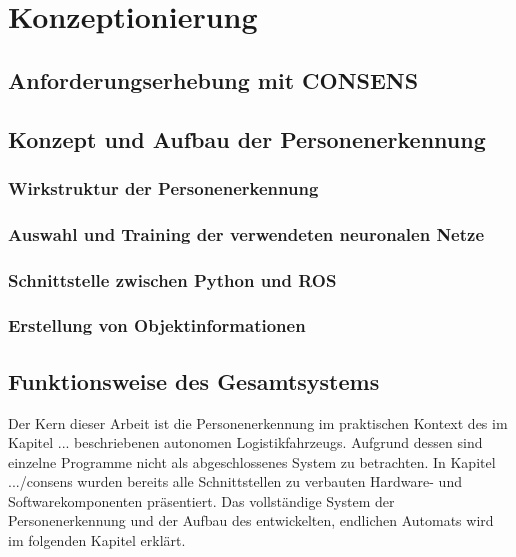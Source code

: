 \chapter{Konzeptionierung}
\label{ch: Konzeptionierung}

	
	
	\section{Anforderungserhebung mit CONSENS}
	\label{sec: Anforderungserhebung}
			
	
	\section{Konzept und Aufbau der Personenerkennung}
	
		\subsection{Wirkstruktur der Personenerkennung}
		
		\subsection{Auswahl und Training der verwendeten neuronalen Netze}
		
		\subsection{Schnittstelle zwischen Python und ROS}
		
		\subsection{Erstellung von Objektinformationen}
		\label{subsec: Erstellung von Objektinformationen}
	
	\section{Funktionsweise des Gesamtsystems}
	Der Kern dieser Arbeit ist die Personenerkennung im praktischen Kontext des im Kapitel ... beschriebenen autonomen Logistikfahrzeugs. Aufgrund dessen sind einzelne Programme nicht als abgeschlossenes System zu betrachten. In Kapitel .../consens wurden bereits alle Schnittstellen zu verbauten Hardware- und Softwarekomponenten präsentiert. Das vollständige System der Personenerkennung und der Aufbau des entwickelten, endlichen Automats wird im folgenden Kapitel erklärt.\\
	
